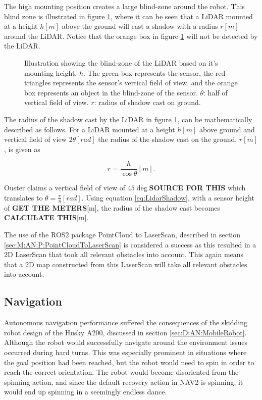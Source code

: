 The high mounting position creates a large blind-zone around the robot. This blind zone is illustrated in figure \ref{fig:D:AN:P:LidarShadow}, where it can be seen that a LiDAR mounted at a height $h[m]$ above the ground will cast a shadow with a radius $r[m]$ around the LiDAR. Notice that the orange box in figure \ref{fig:D:AN:P:LidarShadow} will not be detected by the LiDAR.

\begin{figure}[ht]
  \centering
  
  \caption{Illustration showing the blind-zone of the LiDAR based on it's mounting height, $h$. The green box represents the sensor, the red triangles represents the sensor's vertical field of view, and the orange box represents an object in the blind-zone of the sensor. $\theta$: half of vertical field of view. $r$: radius of shadow cast on ground.}
  \label{fig:D:AN:P:LidarShadow}
\end{figure}

The radius of the shadow cast by the LiDAR in figure \ref{fig:D:AN:P:LidarShadow}, can be mathematically described as follows. For a LiDAR mounted at a height $h[m]$ above ground and vertical field of view $2\theta[rad]$ the radius of the shadow cast on the ground, $r[m]$, is given as

\begin{equation} \label{eq:LidarShadow}
    r = \frac{h}{\cos{\theta}}[m].
\end{equation}

Ouster claims a vertical field of view of $45\deg$\textbf{SOURCE FOR THIS} which translates to $\theta=\frac{\pi}{8}[rad]$. Using equation \ref{eq:LidarShadow}, with a sensor height of \textbf{GET THE METERS}[m], the radius of the shadow cast becomes \textbf{CALCULATE THIS}[m].

The use of the ROS2 package PointCloud to LaserScan, described in section \ref{sec:M:AN:P:PointCloudToLaserScan} is considered a success as this resulted in a 2D LaserScan that took all relevant obstacles into account. This again means that a 2D map constructed from this LaserScan will take all relevant obstacles into account.

\subsection{Navigation}\label{sec:D:AN:Navigation}
Autonomous navigation performance suffered the consequences of the skidding robot design of the Husky A200, discussed in section \ref{sec:D:AN:MobileRobot}. Although the robot would successfully navigate around the environment issues occurred during hard turns. This was especially prominent in situations where the goal position had been reached, but the robot would need to spin in order to reach the correct orientation. The robot would become disoriented from the spinning action, and since the default recovery action in NAV2 is spinning, it would end up spinning in a seemingly endless dance.

